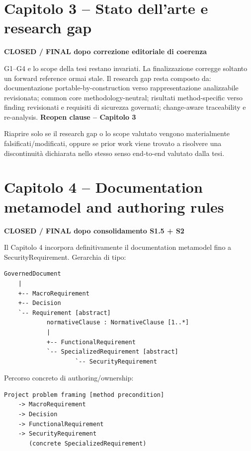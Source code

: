 \documentclass[11pt,a4paper]{article}
\newenvironment{closedbox}[1]{\def\FrameCommand{\fcolorbox{ddtagreen}{ddtagray}}\MakeFramed{\advance\hsize-2\width\FrameRestore}\noindent\textbf{#1}\par\smallskip}{\endMakeFramed}
\newenvironment{reopenbox}[1]{\def\FrameCommand{\fcolorbox{ddtaorange}{ddtagray}}\MakeFramed{\advance\hsize-2\width\FrameRestore}\noindent\textbf{#1}\par\smallskip}{\endMakeFramed}
\begin{document}
\section{Capitolo 3 -- Stato dell'arte e research gap}
\begin{closedbox}{CLOSED / FINAL dopo correzione editoriale di coerenza}
G1--G4 e lo scope della tesi restano invariati. La finalizzazione corregge soltanto un forward reference ormai stale.
\end{closedbox}
Il research gap resta composto da: documentazione portable-by-construction verso rappresentazione analizzabile revisionata; common core methodology-neutral; risultati method-specific verso finding revisionati e requisiti di sicurezza governati; change-aware traceability e re-analysis.
\begin{reopenbox}{Reopen clause -- Capitolo 3}
Riaprire solo se il research gap o lo scope valutato vengono materialmente falsificati/modificati, oppure se prior work viene trovato a risolvere una discontinuità dichiarata nello stesso senso end-to-end valutato dalla tesi.
\end{reopenbox}

\section{Capitolo 4 -- Documentation metamodel and authoring rules}
\begin{closedbox}{CLOSED / FINAL dopo consolidamento S1.5 + S2}
Il Capitolo 4 incorpora definitivamente il documentation metamodel fino a SecurityRequirement.
\end{closedbox}
Gerarchia di tipo:
\begin{lstlisting}
GovernedDocument
    |
    +-- MacroRequirement
    +-- Decision
    `-- Requirement [abstract]
            normativeClause : NormativeClause [1..*]
            |
            +-- FunctionalRequirement
            `-- SpecializedRequirement [abstract]
                    `-- SecurityRequirement
\end{lstlisting}
Percorso concreto di authoring/ownership:
\begin{lstlisting}
Project problem framing [method precondition]
    -> MacroRequirement
    -> Decision
    -> FunctionalRequirement
    -> SecurityRequirement
       (concrete SpecializedRequirement)
\end{lstlisting}
\end{document}
